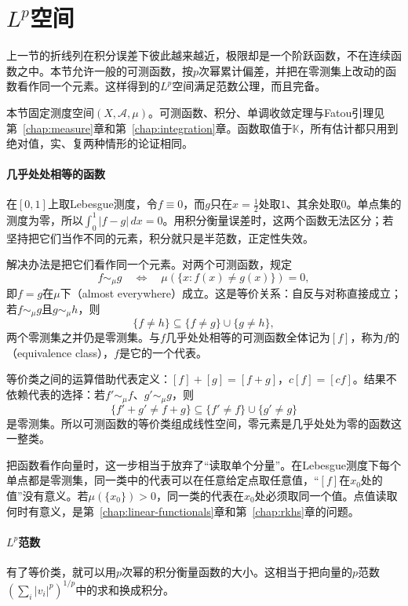 \section{\texorpdfstring{$L^p$}{Lp}空间}
\label{sec:nspace-lp-spaces}

上一节的折线列在积分误差下彼此越来越近，极限却是一个阶跃函数，不在连续函数之中。本节允许一般的可测函数，按$p$次幂累计偏差，并把在零测集上改动的函数看作同一个元素。这样得到的$L^p$空间满足范数公理，而且完备。

本节固定测度空间$(X,\mathcal A,\mu)$。可测函数、积分、单调收敛定理与Fatou引理见第~\ref{chap:measure}章和第~\ref{chap:integration}章。函数取值于$\mathbb K$，所有估计都只用到绝对值，实、复两种情形的论证相同。

\paragraph{几乎处处相等的函数}
在$[0,1]$上取Lebesgue测度，令$f\equiv0$，而$g$只在$x=\tfrac12$处取$1$、其余处取$0$。单点集的测度为零，所以$\int_0^1\lvert f-g\rvert\,dx=0$。用积分衡量误差时，这两个函数无法区分；若坚持把它们当作不同的元素，积分就只是半范数，正定性失效。

解决办法是把它们看作同一个元素。对两个可测函数，规定
\begin{equation}
 f\sim_\mu g\quad\Longleftrightarrow\quad \mu(\{x:f(x)\neq g(x)\})=0,
 \label{eq:nspace-ae-equivalence}
\end{equation}
即$f=g$在$\mu$下（almost everywhere）成立。这是等价关系：自反与对称直接成立；若$f\sim_\mu g$且$g\sim_\mu h$，则
\[
 \{f\neq h\}\subseteq\{f\neq g\}\cup\{g\neq h\},
\]
两个零测集之并仍是零测集。与$f$几乎处处相等的可测函数全体记为$[f]$，称为$f$的（equivalence class），$f$是它的一个代表。

等价类之间的运算借助代表定义：$[f]+[g]=[f+g]$，$c[f]=[cf]$。结果不依赖代表的选择：若$f'\sim_\mu f$、$g'\sim_\mu g$，则
\[
 \{f'+g'\neq f+g\}\subseteq\{f'\neq f\}\cup\{g'\neq g\}
\]
是零测集。所以可测函数的等价类组成线性空间，零元素是几乎处处为零的函数这一整类。

把函数看作向量时，这一步相当于放弃了“读取单个分量”。在Lebesgue测度下每个单点都是零测集，同一类中的代表可以在任意给定点取任意值，“$[f]$在$x_0$处的值”没有意义。若$\mu(\{x_0\})>0$，同一类的代表在$x_0$处必须取同一个值。点值读取何时有意义，是第~\ref{chap:linear-functionals}章和第~\ref{chap:rkhs}章的问题。

\paragraph{\texorpdfstring{$L^p$}{Lp}范数}
有了等价类，就可以用$p$次幂的积分衡量函数的大小。这相当于把向量的$p$范数$(\sum_i\lvert v_i\rvert^p)^{1/p}$中的求和换成积分。

